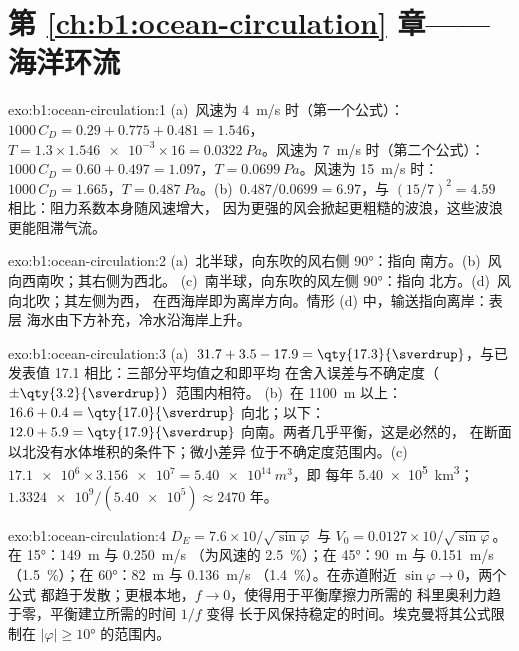 \section*{第 \ref{ch:b1:ocean-circulation} 章——海洋环流}

\begin{solution}{exo:b1:ocean-circulation:1}
(a)~风速为 \qty{4}{m/s} 时（第一个公式）：$1000\,C_D = 0.29 + 0.775 + 0.481 = 1.546$，
$T = 1.3 \times \num{1.546e-3} \times 16 = \qty{0.0322}{Pa}$。风速为 \qty{7}{m/s}
时（第二个公式）：$1000\,C_D = 0.60 + 0.497 = 1.097$，$T = \qty{0.0699}{Pa}$。风速为
\qty{15}{m/s} 时：$1000\,C_D = 1.665$，$T = \qty{0.487}{Pa}$。(b)~$0.487/0.0699 =
6.97$，与 $(15/7)^2 = 4.59$ 相比：阻力系数本身随风速增大，
因为更强的风会掀起更粗糙的波浪，这些波浪更能阻滞气流。
\end{solution}

\begin{solution}{exo:b1:ocean-circulation:2}
(a)~北半球，向东吹的风右侧 \ang{90}：指向
南方。(b)~风向西南吹；其右侧为西北。
(c)~南半球，向东吹的风左侧 \ang{90}：指向
北方。(d)~风向北吹；其左侧为西，
在西海岸即为离岸方向。情形 (d) 中，输送指向离岸：表层
海水由下方补充，冷水沿海岸上升。
\end{solution}

\begin{solution}{exo:b1:ocean-circulation:3}
(a)~$31.7 + 3.5 - 17.9 = \qty{17.3}{\sverdrup}$，与已发表值
\qty{17.1}{\sverdrup} 相比：三部分平均值之和即平均
在舍入误差与不确定度（$\pm\qty{3.2}{\sverdrup}$）范围内相符。
(b)~在 \qty{1100}{m} 以上：$16.6 + 0.4 = \qty{17.0}{\sverdrup}$ 向北；以下：
$12.0 + 5.9 = \qty{17.9}{\sverdrup}$ 向南。两者几乎平衡，这是必然的，
在断面以北没有水体堆积的条件下；微小差异
位于不确定度范围内。(c)~$\num{17.1e6} \times \num{3.156e7} = \qty{5.40e14}{m^3}$，即
每年 \qty{5.40e5}{km^3}；$\num{1.3324e9}/(\num{5.40e5}) \approx 2470$ 年。
\end{solution}

\begin{solution}{exo:b1:ocean-circulation:4}
$D_E = 7.6 \times 10/\sqrt{\sin\varphi}$ 与 $V_0 = 0.0127 \times
10/\sqrt{\sin\varphi}$。在 \ang{15}：\qty{149}{m} 与 \qty{0.250}{m/s}
（为风速的 \qty{2.5}{\percent}）；在 \ang{45}：\qty{90}{m} 与 \qty{0.151}{m/s}
（\qty{1.5}{\percent}）；在 \ang{60}：\qty{82}{m} 与 \qty{0.136}{m/s}
（\qty{1.4}{\percent}）。在赤道附近 $\sin\varphi \to 0$，两个公式
都趋于发散；更根本地，$f \to 0$，使得用于平衡摩擦力所需的
科里奥利力趋于零，平衡建立所需的时间 $1/f$ 变得
长于风保持稳定的时间。埃克曼将其公式限制在 $|\varphi| \geq
\ang{10}$ 的范围内。
\end{solution}

